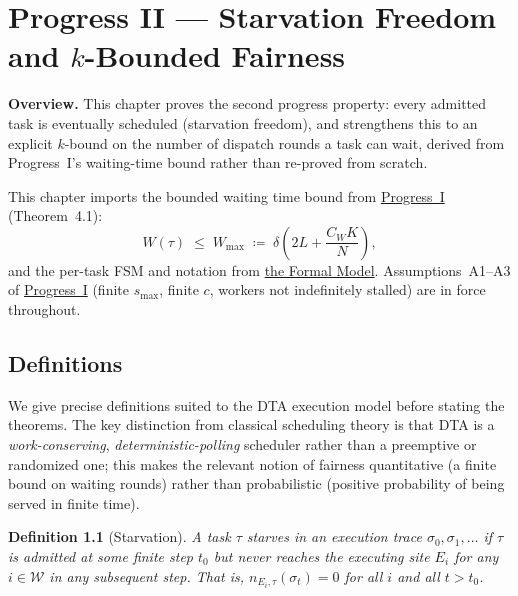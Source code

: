 \documentclass[11pt,a4paper]{report}
\newtheorem{definition}{Definition}[section]
\begin{document}

\chapter{Progress II --- Starvation Freedom and $k$-Bounded Fairness}
\label{chap:starvation}

\bigskip
\noindent\textbf{Overview.}
This chapter proves the second progress property: every admitted
task is eventually scheduled (starvation freedom), and strengthens
this to an explicit $k$-bound on the number of dispatch rounds a task
can wait, derived from Progress~I's waiting-time bound rather than
re-proved from scratch.

This chapter imports the bounded waiting time bound from
\hyperref[chap:bounded_wait]{Progress~I} (Theorem~4.1):
\[
  W(\tau) \;\leq\; W_{\max}
  \;\coloneqq\; \delta\!\left(2L + \frac{C_W K}{N}\right),
\]
and the per-task FSM and notation from
\hyperref[chap:formal_model]{the Formal Model}.  Assumptions~A1--A3
of \hyperref[chap:bounded_wait]{Progress~I} (finite $s_{\max}$, finite $c$,
workers not indefinitely stalled) are in force throughout.

\section{Definitions}

We give precise definitions suited to the DTA execution model
before stating the theorems.  The key distinction from classical
scheduling theory is that DTA is a \emph{work-conserving},
\emph{deterministic-polling} scheduler rather than a preemptive
or randomized one; this makes the relevant notion of fairness
quantitative (a finite bound on waiting rounds) rather than
probabilistic (positive probability of being served in finite time).

\begin{definition}[Starvation]
\label{def:starve}
A task $\tau$ \emph{starves} in an execution trace
$\sigma_0, \sigma_1, \ldots$ if $\tau$ is admitted at some finite
step $t_0$ but never reaches the executing site $E_i$ for any
$i \in \mathcal{W}$ in any subsequent step.  That is,
$n_{E_i, \tau}(\sigma_t) = 0$ for all $i$ and all $t > t_0$.
\end{definition}
\end{document}
